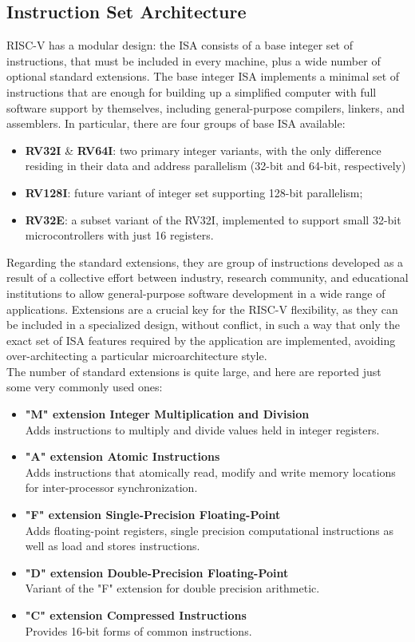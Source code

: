 \subsection{Instruction Set Architecture}
RISC-V has a modular design: the ISA consists of a base integer set of instructions, that must be included in every machine, plus a wide number of optional standard extensions.
The base integer ISA implements a minimal set of instructions that are enough for building up a simplified computer with full software support by themselves, including general-purpose compilers, linkers, and assemblers.
In particular, there are four groups of base ISA available:
\begin{itemize}
\item \textbf{RV32I} \& \textbf{RV64I}: two primary integer variants, with the only difference residing in their data and address parallelism (32-bit and 64-bit, respectively)
\item \textbf{RV128I}: future variant of integer set supporting 128-bit parallelism;
\item \textbf{RV32E}: a subset variant of the RV32I, implemented to support small 32-bit microcontrollers with just 16 registers.
\end{itemize}
Regarding the standard extensions, they are group of instructions developed as a result of a collective effort between industry, research community, and educational institutions to allow general-purpose software development in a wide range of applications. Extensions are a crucial key for the RISC-V flexibility, as they can be included in a specialized design, without conflict, in such a way that only the exact set of ISA features required by the application are implemented, avoiding over-architecting a particular microarchitecture style.\\
The number of standard extensions is quite large, and here are reported just some very commonly used ones:
\begin{itemize}
\item \textbf{"M" extension \textbullet Integer Multiplication and Division} \\ Adds instructions to multiply and divide values held in integer registers.
\item \textbf{"A" extension \textbullet Atomic Instructions} \\ Adds instructions that atomically read, modify and write memory locations for inter-processor synchronization.
\item \textbf{"F" extension \textbullet Single-Precision Floating-Point} \\ Adds floating-point registers, single precision computational instructions as well as load and stores instructions.
\item \textbf{"D" extension \textbullet Double-Precision Floating-Point} \\ Variant of the "F" extension for double precision arithmetic.
\item \textbf{"C" extension \textbullet Compressed Instructions} \\ Provides 16-bit forms of common instructions.
\end{itemize}
